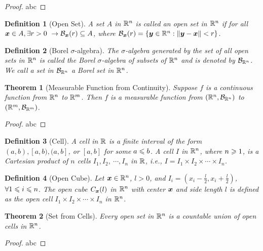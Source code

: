 \documentclass[openany,12pt]{book}
\newtheorem{theorem}{Theorem}[chapter]
\newtheorem{definition}{Definition}[chapter]
\begin{document}
\begin{proof}
  abc
\end{proof}

\begin{definition}[Open Set]
A set $A$ in $\mathbb{R}^n$ is called an open set in $\mathbb{R}^n$ if for all $\bm{x}\in A, \exists r>0\ \to\mathcal{B}_{\bm{x}}(r)\subseteq A$, where $\mathcal{B}_{\bm{x}}(r)=\left\{\bm{y}\in\mathbb{R}^n:\Arrowvert\bm{y}-\bm{x}\Arrowvert<r\right\}$.
\end{definition}

\begin{definition}[Borel $\sigma$-algebra]
The $\sigma$-algebra generated by the set of all open sets in $\mathbb{R}^n$ is called the Borel $\sigma$-algebra of subsets of $\mathbb{R}^n$ and is denoted by $\mathcal{B}_{\mathbb{R}^n}$. We call a set in $\mathcal{B}_{\mathbb{R}^n}$ a Borel set in $\mathbb{R}^n$.
\end{definition}

\begin{theorem}[Measurable Function from Continuity]
Suppose $f$ is a continuous function from $\mathbb{R}^n$ to $\mathbb{R}^m$. Then $f$ is a measurable function from $(\mathbb{R}^n,\mathcal{B}_{\mathbb{R}^n})$ to $(\mathbb{R}^m,\mathcal{B}_{\mathbb{R}^m})$.
\end{theorem}

\begin{proof}
  abc
\end{proof}

\begin{definition}[Cell]
A cell in $\mathbb{R}$ is a finite interval of the form $(a,b),[a,b),(a,b]$, or $[a,b]$ for some $a\leqslant b$. A cell $I$ in $\mathbb{R}^n$, where $n\geqslant1$, is a Cartesian product of $n$ cells $I_1,I_2,\ \cdots,I_n$ in $\mathbb{R}$, i.e., $I=I_1\times I_2\times\cdots\times I_n$.
\end{definition}

\begin{definition}[Open Cube]
Let $\bm{x}\in\mathbb{R}^n$, $l>0$, and $I_i=\left(x_i-\frac{l}{2},x_i+\frac{l}{2}\right)$,$\forall1\leqslant i\leqslant n$. The open cube $C_{\bm{x}}(l)$ in $\mathbb{R}^n$ with center $\bm{x}$ and side length $l$ is defined as the open cell $I_1\times I_2\times\cdots\times I_n$  in $\mathbb{R}^n$.
\end{definition}

\begin{theorem}[Set from Cells]
Every open set in $\mathbb{R}^n$ is a countable union of open cells in $\mathbb{R}^n$.
\end{theorem}

\begin{proof}
  abc
\end{proof}
\end{document}
